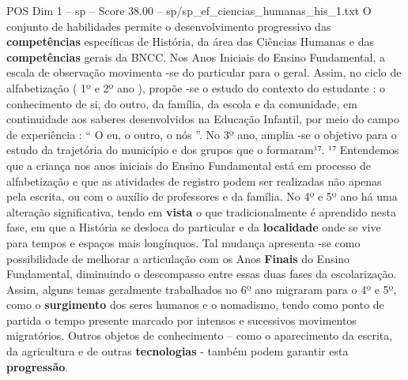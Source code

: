 \begin{textsample}{POS Dim 1 – sp – Score 38.00 – sp/sp\_ef\_ciencias\_humanas\_his\_1.txt}
O conjunto de habilidades permite o desenvolvimento progressivo das \textbf{competências} específicas de História, da área das Ciências Humanas e das \textbf{competências} gerais da BNCC.
Nos Anos Iniciais do Ensino Fundamental, a escala de observação movimenta -se do particular para o geral.
Assim, no ciclo de alfabetização ( 1º e 2º ano ), propõe -se o estudo do contexto do estudante : o conhecimento de si, do outro, da família, da escola e da comunidade, em continuidade aos saberes desenvolvidos na Educação Infantil, por meio do campo de experiência : “ O eu, o outro, o nós ”.
No 3º ano, amplia -se o objetivo para o estudo da trajetória do município e dos grupos que o formaram¹⁷. ¹⁷ Entendemos que a criança nos anos iniciais do Ensino Fundamental está em processo de alfabetização e que as atividades de registro podem ser realizadas não apenas pela escrita, ou com o auxílio de professores e da família.
No 4º e 5º ano há uma alteração significativa, tendo em \textbf{vista} o que tradicionalmente é aprendido nesta fase, em que a História se desloca do particular e da \textbf{localidade} onde se vive para tempos e espaços mais longínquos.
Tal mudança apresenta -se como possibilidade de melhorar a articulação com os Anos \textbf{Finais} do Ensino Fundamental, diminuindo o descompasso entre essas duas fases da escolarização.
Assim, alguns temas geralmente trabalhados no 6º ano migraram para o 4º e 5º, como o \textbf{surgimento} dos seres humanos e o nomadismo, tendo como ponto de partida o tempo presente marcado por intensos e sucessivos movimentos migratórios.
Outros objetos de conhecimento – como o aparecimento da escrita, da agricultura e de outras \textbf{tecnologias} - também podem garantir esta \textbf{progressão}.

\end{textsample}
